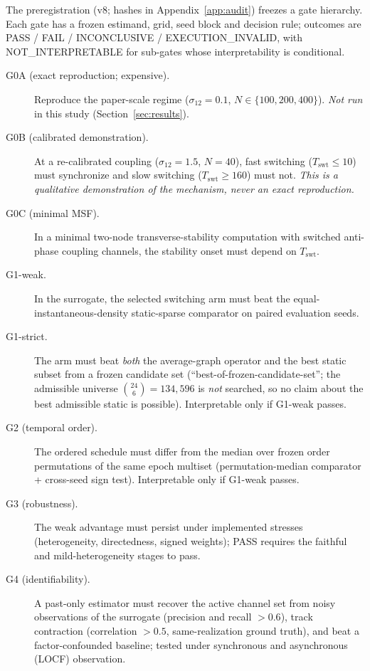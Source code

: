 \documentclass[11pt]{article}
\newcommand{\Tswt}{T_{\mathrm{swt}}}
\begin{document}
The preregistration (v8; hashes in Appendix~\ref{app:audit}) freezes a gate
hierarchy. Each gate has a frozen estimand, grid, seed block and decision
rule; outcomes are PASS / FAIL / INCONCLUSIVE / EXECUTION\_INVALID, with
NOT\_INTERPRETABLE for sub-gates whose interpretability is conditional.

\begin{description}
  \item[G0A (exact reproduction; expensive).] Reproduce the paper-scale regime
  ($\sigma_{12}=0.1$, $N\in\{100,200,400\}$). \emph{Not run} in this study
  (Section~\ref{sec:results}).
  \item[G0B (calibrated demonstration).] At a re-calibrated coupling
  ($\sigma_{12}=1.5$, $N=40$), fast switching ($\Tswt\le 10$) must synchronize
  and slow switching ($\Tswt\ge 160$) must not. \emph{This is a qualitative
  demonstration of the mechanism, never an exact reproduction.}
  \item[G0C (minimal MSF).] In a minimal two-node transverse-stability
  computation with switched anti-phase coupling channels, the stability onset
  must depend on $\Tswt$.
  \item[G1-weak.] In the surrogate, the selected switching arm must beat the
  equal-instantaneous-density static-sparse comparator on paired evaluation
  seeds.
  \item[G1-strict.] The arm must beat \emph{both} the average-graph operator
  and the best static subset from a frozen candidate set
  (``best-of-frozen-candidate-set''; the admissible universe
  $\binom{24}{6}=134{,}596$ is \emph{not} searched, so no claim about the best
  admissible static is possible). Interpretable only if G1-weak passes.
  \item[G2 (temporal order).] The ordered schedule must differ from the median
  over frozen order permutations of the same epoch multiset
  (permutation-median comparator + cross-seed sign test). Interpretable only
  if G1-weak passes.
  \item[G3 (robustness).] The weak advantage must persist under implemented
  stresses (heterogeneity, directedness, signed weights); PASS requires the
  faithful and mild-heterogeneity stages to pass.
  \item[G4 (identifiability).] A past-only estimator must recover the active
  channel set from noisy observations of the surrogate (precision and recall
  $>0.6$), track contraction (correlation $>0.5$, same-realization ground
  truth), and beat a factor-confounded baseline; tested under synchronous and
  asynchronous (LOCF) observation.
\end{description}
\end{document}
